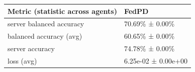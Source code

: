 \begin{tabular}{ll}
\hline
 Metric (statistic across agents)   & FedPD               \\
\hline
 server balanced accuracy           & 70.69\% ± 0.00\%      \\
 balanced accuracy (avg)            & 60.65\% ± 0.00\%      \\
 server accuracy                    & 74.78\% ± 0.00\%      \\
 loss (avg)                         & 6.25e-02 ± 0.00e+00 \\
\hline
\end{tabular}